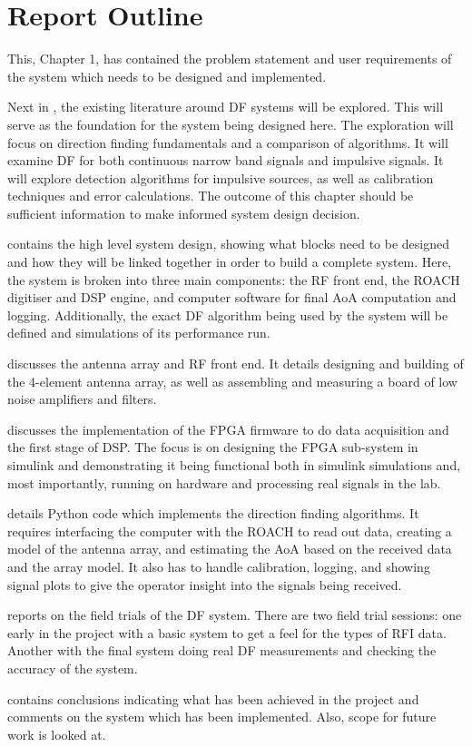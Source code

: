 \section{Report Outline}
This, Chapter 1, has contained the problem statement and user requirements of the system which needs to be designed and implemented. 

Next in , the existing literature around DF systems will be explored. This will serve as the foundation for the system being designed here. The exploration will focus on direction finding fundamentals and a comparison of algorithms. It will examine DF for both continuous narrow band signals and impulsive signals. It will explore detection algorithms for impulsive sources, as well as calibration techniques and error calculations. The outcome of this chapter should be sufficient information to make informed system design decision.

 contains the high level system design, showing what blocks need to be designed and how they will be linked together in order to build a complete system. Here, the system is broken into three main components: the RF front end, the ROACH digitiser and DSP engine, and computer software for final AoA computation and logging. Additionally, the exact DF algorithm being used by the system will be defined and simulations of its performance run.

 discusses the antenna array and RF front end. It details designing and building of the 4-element antenna array, as well as assembling and measuring a board of low noise amplifiers and filters.

 discusses the implementation of the FPGA firmware to do data acquisition and the first stage of DSP. The focus is on designing the FPGA sub-system in simulink and demonstrating it being functional both in simulink simulations and, most importantly, running on hardware and processing real signals in the lab.

 details Python code which implements the direction finding algorithms. It requires interfacing the computer with the ROACH to read out data, creating a model of the antenna array, and estimating the AoA based on the received data and the array model. It also has to handle calibration, logging, and showing signal plots to give the operator insight into the signals being received.

 reports on the field trials of the DF system. There are two field trial sessions: one early in the project with a basic system to get a feel for the types of RFI data. Another with the final system doing real DF measurements and checking the accuracy of the system.

 contains conclusions indicating what has been achieved in the project and comments on the system which has been implemented. Also, scope for future work is looked at.
